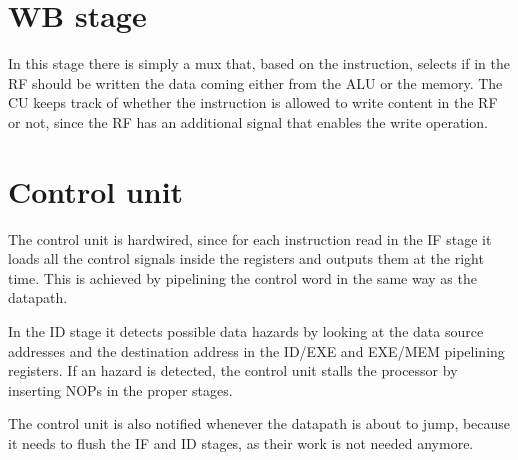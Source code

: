 \section{WB stage}
In this stage there is simply a mux that, based on the instruction, selects if in the RF should be written the data coming
either from the ALU or the memory. The CU keeps track of whether the instruction is allowed to write content in the RF or not,
since the RF has an additional signal that enables the write operation.

\section{Control unit}
The control unit is hardwired, since for each instruction read in the IF stage it loads all the control signals inside the registers
and outputs them at the right time. This is achieved by pipelining the control word in the same way as the datapath.

In the ID stage it detects possible data hazards by looking at the data source addresses and the destination address in the ID/EXE and
EXE/MEM pipelining registers. If an hazard is detected, the control unit stalls the processor by inserting NOPs in the proper stages.

The control unit is also notified whenever the datapath is about to jump, because it needs to flush the IF and ID stages, as their
work is not needed anymore.
